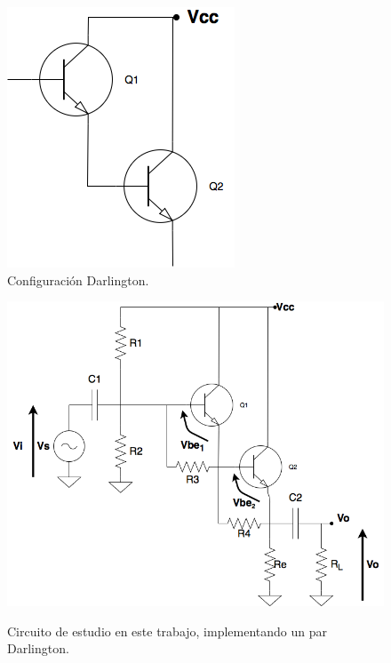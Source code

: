 \begin{figure}[H]
	\centering
		\includegraphics[scale=0.4]{../darlington_ideal.png} 
	\caption{Configuraci\'on Darlington.}
	\label{darlington_ideal}
\end{figure}

\begin{figure}[H]
	\centering
		\includegraphics[scale=0.4]{../darlington_tp.png} \\
	\caption{Circuito de estudio en este trabajo, implementando un par Darlington.}
	\label{darlington_tp}
\end{figure}


